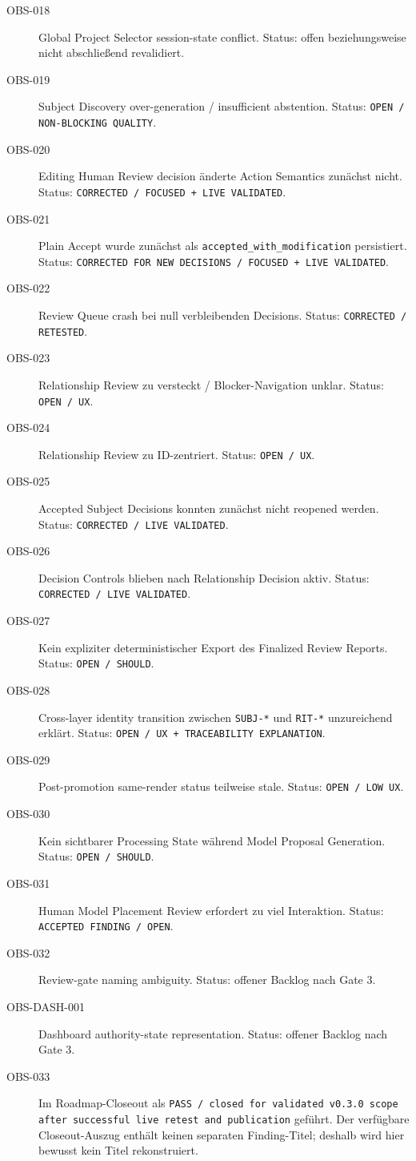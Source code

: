 \begin{description}
    \item[OBS-018] Global Project Selector session-state conflict. Status: offen beziehungsweise nicht abschließend revalidiert.
    \item[OBS-019] Subject Discovery over-generation / insufficient abstention. Status: \texttt{OPEN / NON-BLOCKING QUALITY}.
    \item[OBS-020] Editing Human Review decision änderte Action Semantics zunächst nicht. Status: \texttt{CORRECTED / FOCUSED + LIVE VALIDATED}.
    \item[OBS-021] Plain Accept wurde zunächst als \texttt{accepted\_with\_modification} persistiert. Status: \texttt{CORRECTED FOR NEW DECISIONS / FOCUSED + LIVE VALIDATED}.
    \item[OBS-022] Review Queue crash bei null verbleibenden Decisions. Status: \texttt{CORRECTED / RETESTED}.
    \item[OBS-023] Relationship Review zu versteckt / Blocker-Navigation unklar. Status: \texttt{OPEN / UX}.
    \item[OBS-024] Relationship Review zu ID-zentriert. Status: \texttt{OPEN / UX}.
    \item[OBS-025] Accepted Subject Decisions konnten zunächst nicht reopened werden. Status: \texttt{CORRECTED / LIVE VALIDATED}.
    \item[OBS-026] Decision Controls blieben nach Relationship Decision aktiv. Status: \texttt{CORRECTED / LIVE VALIDATED}.
    \item[OBS-027] Kein expliziter deterministischer Export des Finalized Review Reports. Status: \texttt{OPEN / SHOULD}.
    \item[OBS-028] Cross-layer identity transition zwischen \texttt{SUBJ-*} und \texttt{RIT-*} unzureichend erklärt. Status: \texttt{OPEN / UX + TRACEABILITY EXPLANATION}.
    \item[OBS-029] Post-promotion same-render status teilweise stale. Status: \texttt{OPEN / LOW UX}.
    \item[OBS-030] Kein sichtbarer Processing State während Model Proposal Generation. Status: \texttt{OPEN / SHOULD}.
    \item[OBS-031] Human Model Placement Review erfordert zu viel Interaktion. Status: \texttt{ACCEPTED FINDING / OPEN}.
    \item[OBS-032] Review-gate naming ambiguity. Status: offener Backlog nach Gate 3.
    \item[OBS-DASH-001] Dashboard authority-state representation. Status: offener Backlog nach Gate 3.
    \item[OBS-033] Im Roadmap-Closeout als \texttt{PASS / closed for validated v0.3.0 scope after successful live retest and publication} geführt. Der verfügbare Closeout-Auszug enthält keinen separaten Finding-Titel; deshalb wird hier bewusst kein Titel rekonstruiert.
\end{description}

